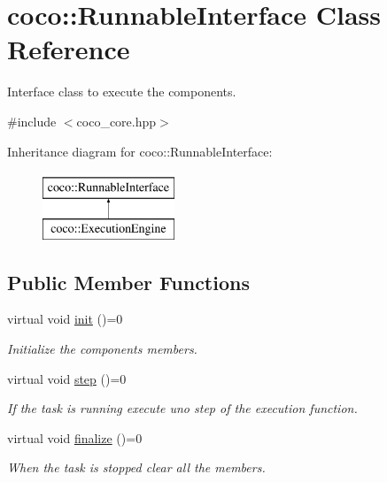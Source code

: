 \hypertarget{classcoco_1_1_runnable_interface}{}\section{coco\+:\+:Runnable\+Interface Class Reference}
\label{classcoco_1_1_runnable_interface}


Interface class to execute the components.  




{\ttfamily \#include $<$coco\+\_\+core.\+hpp$>$}

Inheritance diagram for coco\+:\+:Runnable\+Interface\+:\begin{figure}[H]
\begin{center}
\leavevmode
\includegraphics[height=2.000000cm]{classcoco_1_1_runnable_interface}
\end{center}
\end{figure}
\subsection*{Public Member Functions}
\begin{DoxyCompactItemize}
\item 
\hypertarget{classcoco_1_1_runnable_interface_aa104a540e574daa30a7b113150ccf0fb}{}virtual void \hyperlink{classcoco_1_1_runnable_interface_aa104a540e574daa30a7b113150ccf0fb}{init} ()=0\label{classcoco_1_1_runnable_interface_aa104a540e574daa30a7b113150ccf0fb}

\begin{DoxyCompactList}\small\item\em Initialize the components members. \end{DoxyCompactList}\item 
\hypertarget{classcoco_1_1_runnable_interface_a056e59ec3ee688ad7c35ebbf2c1a7d87}{}virtual void \hyperlink{classcoco_1_1_runnable_interface_a056e59ec3ee688ad7c35ebbf2c1a7d87}{step} ()=0\label{classcoco_1_1_runnable_interface_a056e59ec3ee688ad7c35ebbf2c1a7d87}

\begin{DoxyCompactList}\small\item\em If the task is running execute uno step of the execution function. \end{DoxyCompactList}\item 
\hypertarget{classcoco_1_1_runnable_interface_acbe1640138c6d48f23ba53c821663419}{}virtual void \hyperlink{classcoco_1_1_runnable_interface_acbe1640138c6d48f23ba53c821663419}{finalize} ()=0\label{classcoco_1_1_runnable_interface_acbe1640138c6d48f23ba53c821663419}

\begin{DoxyCompactList}\small\item\em When the task is stopped clear all the members. \end{DoxyCompactList}\end{DoxyCompactItemize}


